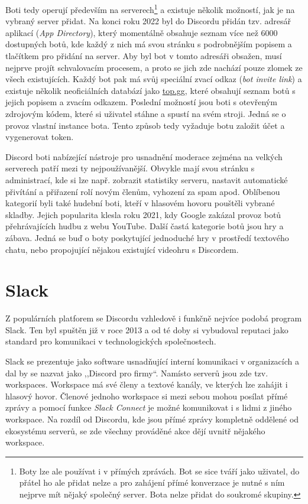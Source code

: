 \documentclass[FM]{tulthesis}
\begin{document}
	Boti tedy operují především na serverech\footnote{Boty lze ale používat i v přímých zprávách. Bot se sice tváří jako uživatel, do přátel ho ale přidat nelze a pro zahájení přímé konverzace je nutné s ním nejprve mít nějaký společný server. Bota nelze přidat do soukromé skupiny.} a existuje několik možností, jak je na vybraný server přidat. Na konci roku 2022 byl do Discordu přidán tzv. adresář aplikací (\textit{App Directory}), který momentálně obsahuje seznam více než 6000 dostupných botů, kde každý z nich má svou stránku s podrobnějším popisem a tlačítkem pro přidání na server. Aby byl bot v tomto adresáři obsažen, musí nejprve projít schvalovacím procesem, a proto se jich zde nachází pouze zlomek ze všech existujících. Každý bot pak má svůj speciální zvací odkaz (\textit{bot invite link}) a existuje několik neoficiálních databází jako \href{https://top.gg}{top.gg}, které obsahují seznam botů s jejich popisem a zvacím odkazem. Poslední možností jsou boti s otevřeným zdrojovým kódem, které si uživatel stáhne a spustí na svém stroji. Jedná se o provoz vlastní instance bota. Tento způsob tedy vyžaduje botu založit účet a vygenerovat token.
	
	Discord boti nabízející nástroje pro usnadnění moderace zejména na velkých serverech patří mezi ty nejpoužívanější. Obvykle mají svou stránku s administrací, kde si lze např. zobrazit statistiky serveru, nastavit automatické přivítání a přiřazení rolí novým členům, vyhození za spam apod. Oblíbenou kategorií byli také hudební boti, kteří v hlasovém hovoru pouštěli vybrané skladby. Jejich popularita klesla roku 2021, kdy Google zakázal provoz botů přehrávajících hudbu z webu \mbox{YouTube}. Další častá kategorie botů jsou hry a zábava. Jedná se buď o boty poskytující jednoduché hry v prostředí textového chatu, nebo propojující nějakou existující videohru s Discordem.
	
	\section{Slack}
	
	Z populárních platforem se Discordu vzhledově i funkčně nejvíce podobá program Slack. Ten byl spuštěn již v roce 2013 a od té doby si vybudoval reputaci jako standard pro komunikaci v technologických společnostech. \cite{lit_Discord}
	
	Slack se prezentuje jako software usnadňující interní komunikaci v organizacích a dal by se nazvat jako ,,Discord pro firmy``. Namísto serverů jsou zde tzv. workspaces. Workspace má své členy a textové kanály, ve kterých lze zahájit i hlasový hovor. Členové jednoho workspace si mezi sebou mohou posílat přímé zprávy a pomocí funkce \textit{Slack Connect} je možné komunikovat i s lidmi z jiného workspace. Na rozdíl od Discordu, kde jsou přímé zprávy kompletně oddělené od ekosystému serverů, se zde všechny prováděné akce dějí uvnitř nějakého workspace.
	
\end{document}
